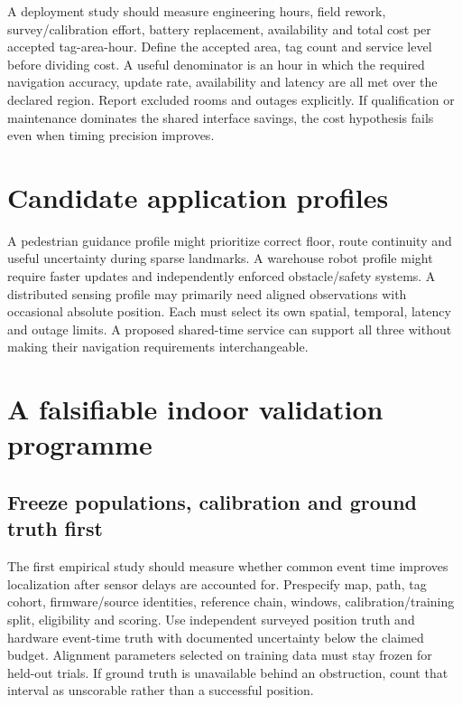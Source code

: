 \documentclass[11pt,letterpaper]{article}
\begin{document}
A deployment study should measure engineering hours, field rework, survey/calibration effort, battery replacement, availability and total cost per accepted tag-area-hour. Define the accepted area, tag count and service level before dividing cost. A useful denominator is an hour in which the required navigation accuracy, update rate, availability and latency are all met over the declared region. Report excluded rooms and outages explicitly. If qualification or maintenance dominates the shared interface savings, the cost hypothesis fails even when timing precision improves.

\section{Candidate application profiles}
A pedestrian guidance profile might prioritize correct floor, route continuity and useful uncertainty during sparse landmarks. A warehouse robot profile might require faster updates and independently enforced obstacle/safety systems. A distributed sensing profile may primarily need aligned observations with occasional absolute position. Each must select its own spatial, temporal, latency and outage limits. A proposed shared-time service can support all three without making their navigation requirements interchangeable.

\section{A falsifiable indoor validation programme}\label{sec:validation}
\subsection{Freeze populations, calibration and ground truth first}
The first empirical study should measure whether common event time improves localization after sensor delays are accounted for. Prespecify map, path, tag cohort, firmware/source identities, reference chain, windows, calibration/training split, eligibility and scoring. Use independent surveyed position truth and hardware event-time truth with documented uncertainty below the claimed budget. Alignment parameters selected on training data must stay frozen for held-out trials. If ground truth is unavailable behind an obstruction, count that interval as unscorable rather than a successful position.
\end{document}
